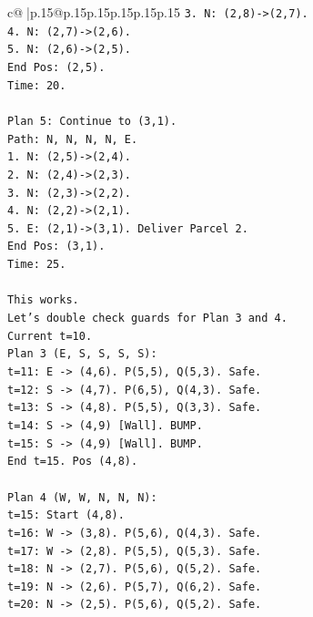 \documentclass{article}
\begin{document}
{\begin{supertabular}{c@{$\;$}|p{.15\linewidth}@{}p{.15\linewidth}p{.15\linewidth}p{.15\linewidth}p{.15\linewidth}p{.15\linewidth}}
{{{\texttt{3. N: (2,8){-}>(2,7).} \\
\texttt{4. N: (2,7){-}>(2,6).} \\
\texttt{5. N: (2,6){-}>(2,5).} \\
\texttt{End Pos: (2,5).} \\
\texttt{Time: 20.} \\
\\ 
\texttt{Plan 5: Continue to (3,1).} \\
\texttt{Path: N, N, N, N, E.} \\
\texttt{1. N: (2,5){-}>(2,4).} \\
\texttt{2. N: (2,4){-}>(2,3).} \\
\texttt{3. N: (2,3){-}>(2,2).} \\
\texttt{4. N: (2,2){-}>(2,1).} \\
\texttt{5. E: (2,1){-}>(3,1). Deliver Parcel 2.} \\
\texttt{End Pos: (3,1).} \\
\texttt{Time: 25.} \\
\\ 
\texttt{This works.} \\
\texttt{Let's double check guards for Plan 3 and 4.} \\
\texttt{Current t=10.} \\
\texttt{Plan 3 (E, S, S, S, S):} \\
\texttt{t=11: E {-}> (4,6). P(5,5), Q(5,3). Safe.} \\
\texttt{t=12: S {-}> (4,7). P(6,5), Q(4,3). Safe.} \\
\texttt{t=13: S {-}> (4,8). P(5,5), Q(3,3). Safe.} \\
\texttt{t=14: S {-}> (4,9) {[}Wall{]}. BUMP.} \\
\texttt{t=15: S {-}> (4,9) {[}Wall{]}. BUMP.} \\
\texttt{End t=15. Pos (4,8).} \\
\\ 
\texttt{Plan 4 (W, W, N, N, N):} \\
\texttt{t=15: Start (4,8).} \\
\texttt{t=16: W {-}> (3,8). P(5,6), Q(4,3). Safe.} \\
\texttt{t=17: W {-}> (2,8). P(5,5), Q(5,3). Safe.} \\
\texttt{t=18: N {-}> (2,7). P(5,6), Q(5,2). Safe.} \\
\texttt{t=19: N {-}> (2,6). P(5,7), Q(6,2). Safe.} \\
\texttt{t=20: N {-}> (2,5). P(5,6), Q(5,2). Safe.} \\
}}}
\end{supertabular}}
\end{document}
